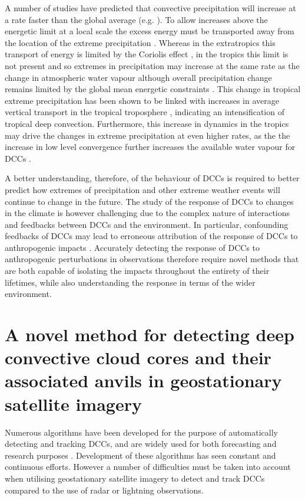 A number of studies have predicted that convective precipitation will increase at a rate faster than the global average (e.g. \citet{ogorman_physical_2009, muller_intensification_2011, ogorman_precipitation_2015, donat_more_2016}).
To allow increases above the energetic limit at a local scale the excess energy must be transported away from the location of the extreme precipitation \citep{muller_energetic_2011}.
Whereas in the extratropics this transport of energy is limited by the Coriolis effect \citep{ogorman_physical_2009}, in the tropics this limit is not present and so extremes in precipitation may increase at the same rate as the change in atmospheric water vapour \citep{ogorman_energetic_2012} although overall precipitation change remains limited by the global mean energetic constraints \citep{allen_constraints_2002}.
This change in tropical extreme precipitation has been shown to be linked with increases in average vertical transport in the tropical troposphere \citep{muller_energetic_2011}, indicating an intensification of tropical deep convection.
Furthermore, this increase in dynamics in the tropics may drive the changes in extreme precipitation at even higher rates, as the the increase in low level convergence further increases the available water vapour for DCCs \citep{ogorman_energetic_2012}.

A better understanding, therefore, of the behaviour of DCCs is required to better predict how extremes of precipitation and other extreme weather events will continue to change in the future.
The study of the response of DCCs to changes in the climate is however challenging due to the complex nature of interactions and feedbacks between DCCs and the environment.
In particular, confounding feedbacks of DCCs may lead to erroneous attribution of the response of DCCs to anthropogenic impacts \citep{varble_erroneous_2018}.
Accurately detecting the response of DCCs to anthropogenic perturbations in observations therefore require novel methods that are both capable of isolating the impacts throughout the entirety of their lifetimes, while also understanding the response in terms of the wider environment.

\section{A novel method for detecting deep convective cloud cores and their associated anvils in geostationary satellite imagery}

Numerous algorithms have been developed for the purpose of automatically detecting and tracking DCCs, and are widely used for both forecasting and research purposes \citep[e.g.][]{mecikalski_use_2011, senf_characterization_2015, senf_satellite-based_2017, feng_life_2012, feng_spatiotemporal_2019, zinner_cb-tram:_2008}.
Development of these algorithms has seen constant and continuous efforts.
However a number of difficulties must be taken into account when utilising geostationary satellite imagery to detect and track DCCs compared to the use of radar or lightning observations.

